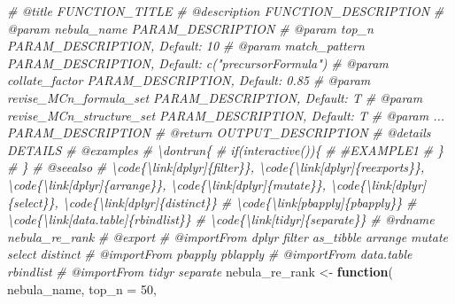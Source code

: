 \documentclass[
]{article}
\newenvironment{Shaded}{\begin{snugshade}}{\end{snugshade}}
\newcommand{\AttributeTok}[1]{\textcolor[rgb]{0.77,0.63,0.00}{#1}}
\newcommand{\CommentTok}[1]{\textcolor[rgb]{0.56,0.35,0.01}{\textit{#1}}}
\newcommand{\ControlFlowTok}[1]{\textcolor[rgb]{0.13,0.29,0.53}{\textbf{#1}}}
\newcommand{\DecValTok}[1]{\textcolor[rgb]{0.00,0.00,0.81}{#1}}
\newcommand{\NormalTok}[1]{#1}
\newcommand{\OtherTok}[1]{\textcolor[rgb]{0.56,0.35,0.01}{#1}}
\begin{document}
\begin{Shaded}
\begin{Highlighting}[]
\CommentTok{\#\textquotesingle{} @title FUNCTION\_TITLE}
\CommentTok{\#\textquotesingle{} @description FUNCTION\_DESCRIPTION}
\CommentTok{\#\textquotesingle{} @param nebula\_name PARAM\_DESCRIPTION}
\CommentTok{\#\textquotesingle{} @param top\_n PARAM\_DESCRIPTION, Default: 10}
\CommentTok{\#\textquotesingle{} @param match\_pattern PARAM\_DESCRIPTION, Default: c("precursorFormula")}
\CommentTok{\#\textquotesingle{} @param collate\_factor PARAM\_DESCRIPTION, Default: 0.85}
\CommentTok{\#\textquotesingle{} @param revise\_MCn\_formula\_set PARAM\_DESCRIPTION, Default: T}
\CommentTok{\#\textquotesingle{} @param revise\_MCn\_structure\_set PARAM\_DESCRIPTION, Default: T}
\CommentTok{\#\textquotesingle{} @param ... PARAM\_DESCRIPTION}
\CommentTok{\#\textquotesingle{} @return OUTPUT\_DESCRIPTION}
\CommentTok{\#\textquotesingle{} @details DETAILS}
\CommentTok{\#\textquotesingle{} @examples }
\CommentTok{\#\textquotesingle{} \textbackslash{}dontrun\{}
\CommentTok{\#\textquotesingle{} if(interactive())\{}
\CommentTok{\#\textquotesingle{}  \#EXAMPLE1}
\CommentTok{\#\textquotesingle{}  \}}
\CommentTok{\#\textquotesingle{} \}}
\CommentTok{\#\textquotesingle{} @seealso }
\CommentTok{\#\textquotesingle{}  \textbackslash{}code\{\textbackslash{}link[dplyr]\{filter\}\}, \textbackslash{}code\{\textbackslash{}link[dplyr]\{reexports\}\}, \textbackslash{}code\{\textbackslash{}link[dplyr]\{arrange\}\}, \textbackslash{}code\{\textbackslash{}link[dplyr]\{mutate\}\}, \textbackslash{}code\{\textbackslash{}link[dplyr]\{select\}\}, \textbackslash{}code\{\textbackslash{}link[dplyr]\{distinct\}\}}
\CommentTok{\#\textquotesingle{}  \textbackslash{}code\{\textbackslash{}link[pbapply]\{pbapply\}\}}
\CommentTok{\#\textquotesingle{}  \textbackslash{}code\{\textbackslash{}link[data.table]\{rbindlist\}\}}
\CommentTok{\#\textquotesingle{}  \textbackslash{}code\{\textbackslash{}link[tidyr]\{separate\}\}}
\CommentTok{\#\textquotesingle{} @rdname nebula\_re\_rank}
\CommentTok{\#\textquotesingle{} @export }
\CommentTok{\#\textquotesingle{} @importFrom dplyr filter as\_tibble arrange mutate select distinct}
\CommentTok{\#\textquotesingle{} @importFrom pbapply pblapply}
\CommentTok{\#\textquotesingle{} @importFrom data.table rbindlist}
\CommentTok{\#\textquotesingle{} @importFrom tidyr separate}
\NormalTok{nebula\_re\_rank }\OtherTok{\textless{}{-}}
  \ControlFlowTok{function}\NormalTok{(}
\NormalTok{           nebula\_name,}
           \AttributeTok{top\_n =} \DecValTok{50}\NormalTok{,}

\end{Highlighting}
\end{Shaded}
\end{document}
